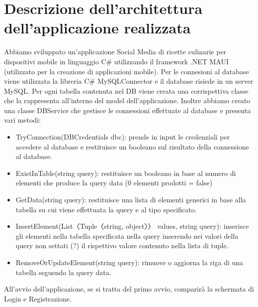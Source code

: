 ﻿\documentclass[a4paper,12pt]{report}
\begin{document}
\section{Descrizione dell'architettura\\ dell'applicazione realizzata}
Abbiamo sviluppato un'applicazione Social Media di ricette culinarie per dispositivi mobile in linguaggio C\# utilizzando il framework .NET MAUI (utilizzato per la creazione di applicazioni mobile).
Per le connesioni al database viene utilizzata la libreria C\# MySQLConnector e il database risiede in un server MySQL.
Per ogni tabella contenuta nel DB viene creata una corrispettiva classe che la rappresenta all'interno del
model dell'applicazione. Inoltre abbiamo creato una classe DBService che gestisce le connessioni effettuate al database e presenta vari metodi:
\begin{itemize}
    \item TryConnection(DBCredentials dbc): prende in input le credenziali per accedere al database e restituisce un booleano sul risultato della connessione al database.
    \item ExistInTable(string query): restituisce un booleano in base al numero di elementi che produce la query data (0 elementi prodotti = false)
    \item GetData(string query): restituisce una lista di elementi generici in base alla tabella su cui viene effettuata la query e al tipo specificato.
    \item InsertElement(List〈Tuple〈string, object〉〉 values, string query): inserisce gli elementi nella tabella specificata nella query inserendo nei valori della query non settati (?) il rispettivo valore contenuto nella lista di tuple.
    \item RemoveOrUpdateElement(string query): rimuove o aggiorna la riga di una tabella seguendo la query data.
\end{itemize}
All'avvio dell'applicazione, se si tratta del primo avvio, comparirà la schermata di Login e Registrazione.
\end{document}

